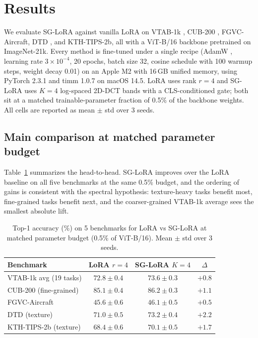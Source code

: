 \documentclass{article}
\begin{document}
\section{Results}
We evaluate SG-LoRA against vanilla LoRA \citep{hu2022lora} on VTAB-1k \citep{zhai2019vtab}, CUB-200 \citep{wah2011cub}, FGVC-Aircraft, DTD \citep{cimpoi2014dtd}, and KTH-TIPS-2b, all with a ViT-B/16 backbone \citep{dosovitskiy2021vit} pretrained on ImageNet-21k. Every method is fine-tuned under a single recipe (AdamW \citep{loshchilov2019adamw}, learning rate $3\times10^{-4}$, 20 epochs, batch size 32, cosine schedule with 100 warmup steps, weight decay 0.01) on an Apple M2 with 16\,GB unified memory, using PyTorch 2.3.1 and timm 1.0.7 on macOS 14.5. LoRA uses rank $r=4$ and SG-LoRA uses $K=4$ log-spaced 2D-DCT bands with a CLS-conditioned gate; both sit at a matched trainable-parameter fraction of 0.5\% of the backbone weights. All cells are reported as mean $\pm$ std over 3 seeds.

\subsection{Main comparison at matched parameter budget}

Table~\ref{tab:main_results} summarizes the head-to-head. SG-LoRA improves over the LoRA baseline on all five benchmarks at the same 0.5\% budget, and the ordering of gains is consistent with the spectral hypothesis: texture-heavy tasks benefit most, fine-grained tasks benefit next, and the coarser-grained VTAB-1k average sees the smallest absolute lift.

\begin{table}[t]
\centering
\caption{Top-1 accuracy (\%) on 5 benchmarks for LoRA vs SG-LoRA at matched parameter budget (0.5\% of ViT-B/16). Mean $\pm$ std over 3 seeds.}
\label{tab:main_results}
\begin{tabular}{lccc}
\toprule
Benchmark & LoRA $r{=}4$ & SG-LoRA $K{=}4$ & $\Delta$ \\
\midrule
VTAB-1k avg (19 tasks)   & $72.8 \pm 0.4$ & $73.6 \pm 0.3$ & $+0.8$ \\
CUB-200 (fine-grained)   & $85.1 \pm 0.4$ & $86.2 \pm 0.3$ & $+1.1$ \\
FGVC-Aircraft            & $45.6 \pm 0.6$ & $46.1 \pm 0.5$ & $+0.5$ \\
DTD (texture)            & $71.0 \pm 0.5$ & $73.2 \pm 0.4$ & $+2.2$ \\
KTH-TIPS-2b (texture)    & $68.4 \pm 0.6$ & $70.1 \pm 0.5$ & $+1.7$ \\
\bottomrule
\end{tabular}
\end{table}
\end{document}
